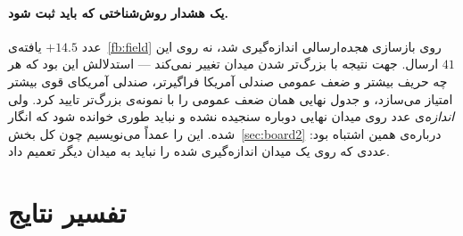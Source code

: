 \documentclass[12pt,a4paper]{article}
\begin{document}
\paragraph{یک هشدار روش‌شناختی که باید ثبت شود.}
عدد $+14.5$ یافته‌ی~\ref{fb:field} روی بازسازی \emph{هجده}‌ارسالی
اندازه‌گیری شد، نه روی این $41$ ارسال. جهت نتیجه با بزرگ‌تر شدن میدان
تغییر نمی‌کند — استدلالش این بود که هر چه حریف بیشتر و ضعف عمومی صندلی
آمریکا فراگیرتر، صندلی آمریکای قوی بیشتر امتیاز می‌سازد، و جدول نهایی
همان ضعف عمومی را با نمونه‌ی بزرگ‌تر تایید کرد. ولی \emph{اندازه}‌ی عدد
روی میدان نهایی دوباره سنجیده نشده و نباید طوری خوانده شود که انگار
شده. این را عمداً می‌نویسیم چون کل بخش~\ref{sec:board2} درباره‌ی همین
اشتباه بود: عددی که روی یک میدان اندازه‌گیری شده را نباید به میدان دیگر
تعمیم داد.

\section{تفسیر نتایج}\label{sec:interp}
\end{document}
